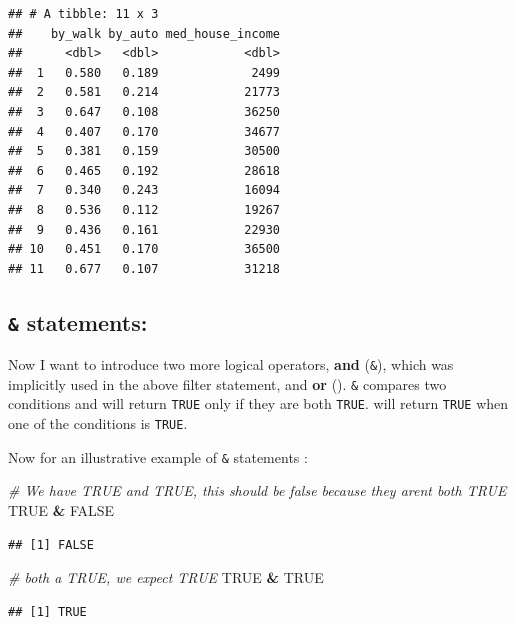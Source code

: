 \documentclass[
]{book}
\newenvironment{Shaded}{\begin{snugshade}}{\end{snugshade}}
\newcommand{\CommentTok}[1]{\textcolor[rgb]{0.56,0.35,0.01}{\textit{#1}}}
\newcommand{\OperatorTok}[1]{\textcolor[rgb]{0.81,0.36,0.00}{\textbf{#1}}}
\newcommand{\OtherTok}[1]{\textcolor[rgb]{0.56,0.35,0.01}{#1}}
\newcommand{\StringTok}[1]{\textcolor[rgb]{0.31,0.60,0.02}{#1}}
\begin{document}
\begin{verbatim}
## # A tibble: 11 x 3
##    by_walk by_auto med_house_income
##      <dbl>   <dbl>            <dbl>
##  1   0.580   0.189             2499
##  2   0.581   0.214            21773
##  3   0.647   0.108            36250
##  4   0.407   0.170            34677
##  5   0.381   0.159            30500
##  6   0.465   0.192            28618
##  7   0.340   0.243            16094
##  8   0.536   0.112            19267
##  9   0.436   0.161            22930
## 10   0.451   0.170            36500
## 11   0.677   0.107            31218
\end{verbatim}

\hypertarget{statements}{%
\subsection{\texorpdfstring{\texttt{\&} statements:}{\& statements:}}\label{statements}}

Now I want to introduce two more logical operators, \textbf{and} (\texttt{\&}), which was implicitly used in the above filter statement, and \textbf{or} (\texttt{\textbar{}}). \texttt{\&} compares two conditions and will return \texttt{TRUE} only if they are both \texttt{TRUE}. \texttt{\textbar{}} will return \texttt{TRUE} when one of the conditions is \texttt{TRUE}.

Now for an illustrative example of \texttt{\&} statements :

\begin{Shaded}
\begin{Highlighting}[]
\CommentTok{\# We have TRUE and TRUE, this should be false because they aren\textquotesingle{}t both TRUE}
\OtherTok{TRUE} \OperatorTok{\&}\StringTok{ }\OtherTok{FALSE} 
\end{Highlighting}
\end{Shaded}

\begin{verbatim}
## [1] FALSE
\end{verbatim}

\begin{Shaded}
\begin{Highlighting}[]
\CommentTok{\# both a TRUE, we expect TRUE}
\OtherTok{TRUE} \OperatorTok{\&}\StringTok{ }\OtherTok{TRUE}
\end{Highlighting}
\end{Shaded}

\begin{verbatim}
## [1] TRUE
\end{verbatim}
\end{document}
